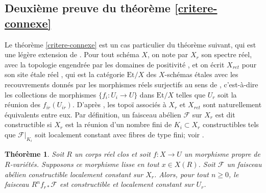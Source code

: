 \documentclass[JEP,XML,SOM,Unicode,francais,published]{cedram}
\newtheorem{thm}{Théorème}[section]
\theoremstyle{definition}
\newcommand{\mc}[1]{\mathcal{#1}}
\begin{document}
\subsection{Deuxième preuve du théorème \ref{critere-connexe}}
Le théorème \ref{critere-connexe} est un cas particulier du
théorème suivant, qui est une légère extension de \cite[Cor.\,17.20(a)]{scheiderer1994real}. Pour tout schéma $X$, on note par $X_r$ son spectre réel, avec la topologie engendrée par les domaines de positivité \cite[(0.4.1)--(0.4.2)]{scheiderer1994real}, et on écrit $X_{ret}$ pour son site étale réel \cite[Def.\,1.2.1]{scheiderer1994real}, qui est la catégorie $\mathrm{Et}/X$ des $X$-schémas étales avec les recouvrements donnés par les morphismes réels surjectifs au sens de \cite[Def.\,(1.1)]{scheiderer1994real}, c'est-à-dire les collections de morphismes $\{f_i\colon U_i\to U\}$ dans $\mathrm{Et}/X$ telles que $U_r$ soit la réunion des $f_{ir}(U_{ir})$. D'après \cite[Th.\,1.3]{scheiderer1994real}, les topoï associés à $X_r$ et $X_{ret}$ sont naturellement équivalents entre eux. Par définition, un faisceau abélien $\mc{F}$ sur $X_r$ est dit constructible si $X_r$ est la réunion d'un nombre fini de $K_i\subset X_r$ constructibles tels que $\mc{F}|_{K_i}$ soit localement constant avec fibres de type fini; voir \cite[Def.\,(A.3)]{scheiderer1994real}.

\begin{thm}\label{loc-const}
Soit $R$ un corps réel clos et soit $f\colon X\to U$ un morphisme propre de $R$-variétés. Supposons ce morphisme lisse en tout $x\in X(R)$. Soit $\mc{F}$ un faisceau abélien constructible localement constant sur $X_r$. Alors, pour tout $n\geq 0$, le faisceau $R^n f_{r*} \mc{F}$ est constructible et localement constant sur $U_r$.
\end{thm}
\end{document}

